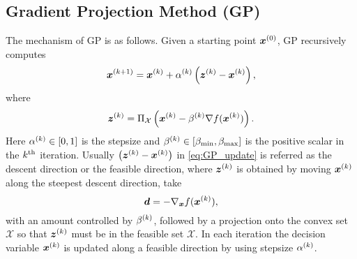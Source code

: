 \subsection{Gradient Projection Method (GP)}
The mechanism of GP is as follows.
Given a starting point $\bm x^{(0)}$, GP recursively computes
\begin{equation}
    \bm x^{(k+1)} =
    \bm x^{(k)} + \alpha^{(k)} \left(\bm z^{(k)}-\bm x^{(k)}\right),
    \label{eq:GP_update}
\end{equation}
where
\begin{equation}
    \bm z^{(k)} =
    \Pi_{\mathcal X} \left( \bm x^{(k)} -
                            \beta^{(k)}\nabla f(\bm x^{(k)}) \right).
    \label{eq:GP_update_2}
\end{equation}
Here $\alpha^{(k)} \in [0,1]$ is the stepsize and $\beta^{(k)} \in
[\beta_{\min},\beta_{\max}]$ is the positive scalar in the $k^\text{th}$ iteration.
Usually $\left( \bm z^{(k)} - \bm x^{(k)} \right)$ in \eqref{eq:GP_update}
is referred as the descent direction or the feasible direction, where
$\bm z^{(k)}$ is obtained by moving $\bm x^{(k)}$ along the steepest
descent direction, \ie take
\begin{equation}
    \bm d = - \nabla_{\bm x} f(\bm x^{(k)}),
\end{equation}
with an amount controlled by $\beta^{(k)}$, followed by a projection onto the
convex set $\mathcal X$ so that $\bm z^{(k)}$ must be in the feasible set
$\mathcal X$.
In each iteration the decision variable $\bm x^{(k)}$ is updated along a
feasible direction by using stepsize $\alpha^{(k)}$.


